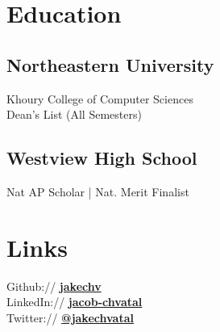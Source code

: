 \documentclass[letterpaper]{deedy-resume} %
\begin{document}
\lastupdated %


\begin{minipage}[t]{0.33\textwidth} %

\section{Education}
\subsection{Northeastern University}
Khoury College of Computer Sciences \\
Dean's List (All Semesters) \\
\sectionspace %

\subsection{Westview High School}
Nat AP Scholar | Nat. Merit Finalist
\sectionspace %

\section{Links}
Github:// \href{https://github.com/jakechv}{\bf jakechv} \\
LinkedIn:// \href{https://www.linkedin.com/in/jacob-chvatal}{\bf jacob-chvatal} \\
Twitter:// \href{https://twitter.com/jakechvatal}{\bf @jakechvatal} \\
\sectionspace %


\end{minipage}
\end{document}

